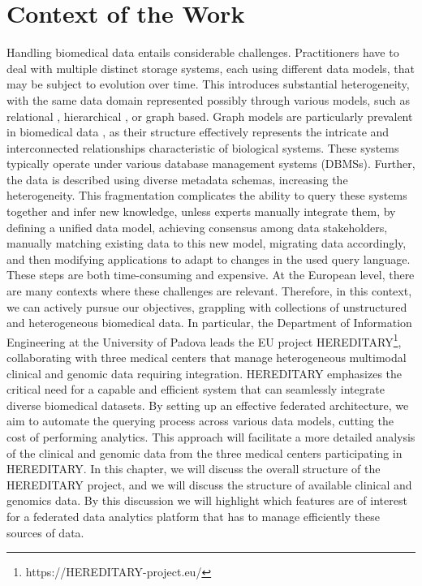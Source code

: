 
\chapter{Context of the Work}
\label{chp:context}
Handling biomedical data entails considerable challenges. Practitioners have to deal with multiple distinct storage systems, each using different data models, that may be subject to evolution over time. This introduces substantial heterogeneity, with the same data domain represented possibly through various models, such as relational \cite{DBLP:journals/nar/HardingAFSADPSD22}, hierarchical \cite{DBLP:journals/nar/WishartKGSHSCW06}, or graph based. Graph models are particularly prevalent in biomedical data \cite{DBLP:journals/nar/PineroBQGDCGSF17} \cite{DBLP:journals/nar/GillespieJSMRSG22}, as their structure effectively represents the intricate and interconnected relationships characteristic of biological systems.
These systems typically operate under various database management systems (DBMSs). Further, the data is described using diverse metadata schemas, increasing the heterogeneity. This fragmentation complicates the ability to query these systems together and infer new knowledge, unless experts manually integrate them, by defining a unified data model, achieving consensus among data stakeholders, manually matching existing data to this new model, migrating data accordingly, and then modifying applications to adapt to changes in the used query language. These steps are both time-consuming and expensive.
At the European level, there are many contexts where these challenges are relevant. Therefore, in this context, we can actively pursue our objectives, grappling with collections of unstructured and heterogeneous biomedical data. In particular, the Department of Information Engineering at the University of Padova leads the EU project \ac{HEREDITARY}\footnote{https://\ac{HEREDITARY}-project.eu/}, collaborating with three medical centers that manage heterogeneous multimodal clinical and genomic data requiring integration. \ac{HEREDITARY} emphasizes the critical need for a capable and efficient system that can seamlessly integrate diverse biomedical datasets. By setting up an effective federated architecture, we aim to automate the querying process across various data models, cutting the cost of performing analytics. This approach will facilitate a more detailed analysis of the clinical and genomic data from the three medical centers participating in \ac{HEREDITARY}.
In this chapter, we will discuss the overall structure of the \ac{HEREDITARY} project, and we will discuss the structure of available clinical and genomics data. By this discussion we will highlight which features are of interest for a federated data analytics platform that has to manage efficiently these sources of data.


